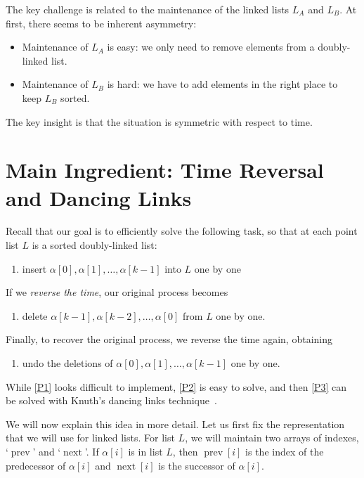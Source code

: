 \documentclass[a4paper,11pt]{article}
\DeclareMathOperator{\prev}{prev}
\DeclareMathOperator{\next}{next}
\begin{document}
The key challenge is related to the maintenance of the linked lists $L_A$ and $L_B$. At first, there seems to be inherent asymmetry:
\begin{itemize}[noitemsep]
    \item Maintenance of $L_A$ is easy: we only need to remove elements from a doubly-linked list.
    \item Maintenance of $L_B$ is hard: we have to add elements in the right place to keep $L_B$ sorted.
\end{itemize}
The key insight is that the situation is symmetric with respect to time.


\section{Main Ingredient: Time Reversal and Dancing Links}

Recall that our goal is to efficiently solve the following task, so that at each point list $L$ is a sorted doubly-linked list:
\begin{enumerate}[label=(P\arabic*),leftmargin=15mm]
    \item\label{P1} insert $\alpha[0], \alpha[1], \dots, \alpha[k-1]$ into $L$ one by one
\end{enumerate}
If we \emph{reverse the time}, our original process becomes
\begin{enumerate}[resume*]
    \item\label{P2} delete $\alpha[k-1], \alpha[k-2], \dots, \alpha[0]$ from $L$ one by one.
\end{enumerate}
Finally, to recover the original process, we reverse the time again, obtaining
\begin{enumerate}[resume*]
    \item\label{P3} undo the deletions of $\alpha[0], \alpha[1], \dots, \alpha[k-1]$ one by one.
\end{enumerate}
While \ref{P1} looks difficult to implement, \ref{P2} is easy to solve, and then \ref{P3} can be solved with Knuth's dancing links technique~\cite{knuth00dancinglinks}.

We will now explain this idea in more detail. Let us first fix the representation that we will use for linked lists. For list $L$, we will maintain two arrays of indexes, `$\prev$' and `$\next$'. If $\alpha[i]$ is in list $L$, then $\prev[i]$ is the index of the predecessor of $\alpha[i]$ and $\next[i]$ is the successor of $\alpha[i]$.
\end{document}
